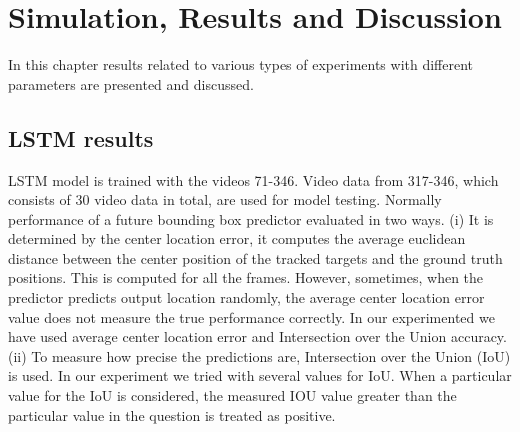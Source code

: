 \chapter{Simulation, Results and Discussion}
In this chapter results related to various types of experiments with different parameters are presented and discussed.

\section{LSTM results} \label{observations}
LSTM model is trained with the videos 71-346. Video data from 317-346, which consists of 30 video data in total, are used for model testing. Normally performance of a future bounding box predictor evaluated  in two ways. 
(i) It is determined by the center location error, it computes the average
euclidean distance between the center position of the tracked targets and the ground truth
positions. This is computed for all the frames. However, sometimes, when the predictor predicts 
output location randomly, the average center location error value does not measure the
true performance correctly. In our experimented we have used average center location error and Intersection over the Union  accuracy. \\

(ii) To measure how precise the predictions are, Intersection over the Union (IoU) is used. In our experiment we tried with several values for IoU. When a particular value for the IoU is considered, the measured IOU value greater than the particular value in the question is treated as positive.

